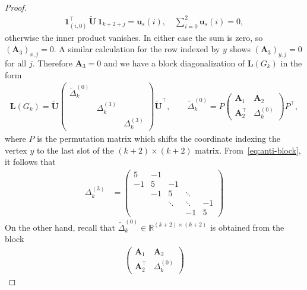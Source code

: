 \documentclass[11pt,a4paper]{amsart}
\begin{document}
\begin{proof}
\begin{align*}
            \mathbf{1}_{(i,0)}^\top\,\widetilde{\mathbf{U}}\,\mathbf{1}_{k+2+j}
            = \mathbf{u}_s(i),
            \quad
            \sum_{i=0}^2 \mathbf{u}_s(i)=0,
        \end{align*}
    otherwise the inner product vanishes. In either case the sum is zero, so $(\mathbf{A}_3)_{x,j}=0$.  A similar calculation for the row indexed by $y$ shows $(\mathbf{A}_3)_{y,j}=0$ for all $j$.  Therefore $\mathbf{A}_3=0$ and we have a block diagonalization of $\mathbf{L}(G_k)$ in the form
        \begin{align*}
            \mathbf{L}(G_k) = \widetilde{\mathbf{U}} \begin{pmatrix}
            \widetilde{\Delta}_k^{(0)} & & \\
            & \Delta_k^{(3)} & \\
            & & \Delta_k^{(3)}
        \end{pmatrix} \widetilde{\mathbf{U}}^\top, \qquad \widetilde{\Delta}_k^{(0)} = P\begin{pmatrix}
            \mathbf{A}_1 & \mathbf{A}_2 \\
            \mathbf{A}_2 ^\top & \Delta_k^{(0)}
        \end{pmatrix}P^\top,
        \end{align*}
    where $P$ is the permutation matrix which shifts the coordinate indexing the vertex $y$ to the last slot of the $(k+2)\times (k+2)$ matrix. From~\cref{eq:anti-block}, it follows that
        \begin{align*}
            \Delta_k^{(3)} &= \begin{pmatrix}
            5 & -1 &        &        & \\
            -1& 5  & -1     &        &  \\
            &-1 & 5      & \ddots &  \\
            &   & \ddots & \ddots & -1\\
            &   &        & -1 & 5
            \end{pmatrix}
        \end{align*}
    On the other hand, recall that $\widetilde{\Delta}_k^{(0)} \in\mathbb R^{(k+2)\times(k+2)}$ is obtained from the block
        \begin{align*}
            \begin{pmatrix}
                \mathbf{A}_1 & \mathbf{A}_2\\[2pt]
                \mathbf{A}_2^{\top} & \Delta_k^{(0)}
                \end{pmatrix}

\end{align*}
\end{proof}
\end{document}

